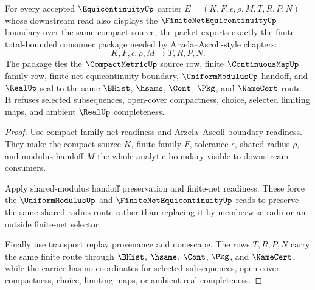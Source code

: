 \begin{theorem}
\label{thm:equicontinuity-compact-family-total-bounded-consumer}
For every accepted $\EquicontinuityUp$ carrier $E=(K,F,\epsilon,\rho,M,T,R,P,N)$ whose downstream read also displays the $\FiniteNetEquicontinuityUp$ boundary over the same compact source, the packet exports exactly the finite total-bounded consumer package needed by Arzela--Ascoli-style chapters:
$$
K,F,\epsilon,\rho,M \longmapsto T,R,P,N .
$$
The package ties the $\CompactMetricUp$ source row, finite $\ContinuousMapUp$ family row, finite-net equicontinuity boundary, $\UniformModulusUp$ handoff, and $\RealUp$ seal to the same $\BHist$, $\hsame$, $\Cont$, $\Pkg$, and $\NameCert$ route. It refuses selected subsequences, open-cover compactness, choice, selected limiting maps, and ambient $\RealUp$ completeness.
\end{theorem}
\begin{proof}
Use compact family-net readiness and Arzela--Ascoli boundary readiness. They make the compact source $K$, finite family $F$, tolerance $\epsilon$, shared radius $\rho$, and modulus handoff $M$ the whole analytic boundary visible to downstream consumers.

Apply shared-modulus handoff preservation and finite-net readiness. These force the $\UniformModulusUp$ and $\FiniteNetEquicontinuityUp$ reads to preserve the same shared-radius route rather than replacing it by memberwise radii or an outside finite-net selector.

Finally use transport replay provenance and nonescape. The rows $T,R,P,N$ carry the same finite route through $\BHist$, $\hsame$, $\Cont$, $\Pkg$, and $\NameCert$, while the carrier has no coordinates for selected subsequences, open-cover compactness, choice, limiting maps, or ambient real completeness.
\end{proof}

